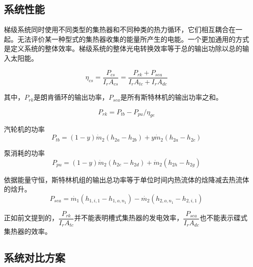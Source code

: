 \subsection{系统性能}

梯级系统同时使用不同类型的集热器和不同种类的热力循环，它们相互耦合在一起。无法评价某一种型式的集热器收集的能量所产生的电能。一个更加通用的方式是定义系统的整体效率。梯级系统的整体光电转换效率等于总的输出功除以总的输入太阳能。

\begin{equation}
	\eta_{cs}=\dfrac{P_{cs}}{I_rA_{cs}} = \dfrac{P_{rk}+ P_{sea}}{I_rA_{tc} + I_rA_{dc}}
\end{equation}

其中，$P_{rk}$是朗肯循环的输出功率，$P_{sea}$是所有斯特林机的输出功率之和。

\begin{equation}
	P_{rk} = P_{tb} - P_{pu} / \eta_{ge}
\end{equation}

汽轮机的功率
\begin{equation}
  P_{tb}=\left(1-y\right)\dot{m}_{2}\left(h_{2a}-h_{2b}\right)+y\dot{m}_{2}\left(h_{2a}-h_{2c}\right)
\end{equation}

泵消耗的功率
\begin{equation}
	P_{pu}=\left(1-y\right)\dot{m}_{2}\left(h_{2e}-h_{2d}\right)+\dot{m}_{2}\left(h_{2h}-h_{2g}\right)
\end{equation}

依据能量守恒，斯特林机组的输出总功率等于单位时间内热流体的焓降减去热流体的焓升。
\begin{equation}
	P_{sea}=\dot{m_1}(h_{1,i,1} - h_{1,o,n_1}) - \dot{m_2}(h_{2,o,n_1} - h_{2,i,1})
\end{equation}

正如前文提到的，$\dfrac{P_{rk}}{I_rA_{tc}}$并不能表明槽式集热器的发电效率，$\dfrac{P_{sea}}{I_rA_{dc}}$也不能表示碟式集热器的效率。

\subsection{系统对比方案}

